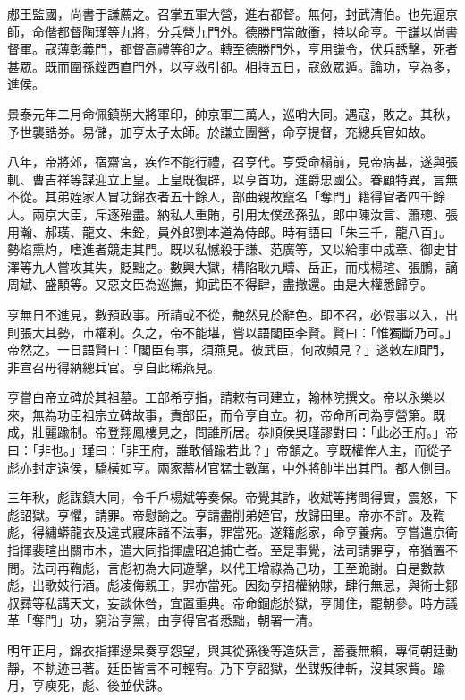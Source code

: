 \begin{pinyinscope}
郕王監國，尚書于謙薦之。召掌五軍大營，進右都督。無何，封武清伯。也先逼京師，命偕都督陶瑾等九將，分兵營九門外。德勝門當敵衝，特以命亨。于謙以尚書督軍。寇薄彰義門，都督高禮等卻之。轉至德勝門外，亨用謙令，伏兵誘擊，死者甚眾。既而圍孫鏜西直門外，以亨救引卻。相持五日，寇斂眾遁。論功，亨為多，進侯。

景泰元年二月命佩鎮朔大將軍印，帥京軍三萬人，巡哨大同。遇寇，敗之。其秋，予世襲誥券。易儲，加亨太子太師。於謙立團營，命亨提督，充總兵官如故。

八年，帝將郊，宿齋宮，疾作不能行禮，召亨代。亨受命榻前，見帝病甚，遂與張軏、曹吉祥等謀迎立上皇。上皇既復辟，以亨首功，進爵忠國公。眷顧特異，言無不從。其弟姪家人冒功錦衣者五十餘人，部曲親故竄名「奪門」籍得官者四千餘人。兩京大臣，斥逐殆盡。納私人重賄，引用太僕丞孫弘，郎中陳汝言、蕭璁、張用瀚、郝璜、龍文、朱銓，員外郎劉本道為侍郎。時有語曰「朱三千，龍八百」。勢焰熏灼，嗜進者競走其門。既以私憾殺于謙、范廣等，又以給事中成章、御史甘澤等九人嘗攻其失，貶黜之。數興大獄，構陷耿九疇、岳正，而戍楊瑄、張鵬，謫周斌、盛顒等。又惡文臣為巡撫，抑武臣不得肆，盡撤還。由是大權悉歸亨。

亨無日不進見，數預政事。所請或不從，艴然見於辭色。即不召，必假事以入，出則張大其勢，市權利。久之，帝不能堪，嘗以語閣臣李賢。賢曰：「惟獨斷乃可。」帝然之。一日語賢曰：「閣臣有事，須燕見。彼武臣，何故頻見？」遂敕左順門，非宣召毋得納總兵官。亨自此稀燕見。

亨嘗白帝立碑於其祖墓。工部希亨指，請敕有司建立，翰林院撰文。帝以永樂以來，無為功臣祖宗立碑故事，責部臣，而令亨自立。初，帝命所司為亨營第。既成，壯麗踰制。帝登翔鳳樓見之，問誰所居。恭順侯吳瑾謬對曰：「此必王府。」帝曰：「非也。」瑾曰：「非王府，誰敢僭踰若此？」帝頷之。亨既權侔人主，而從子彪亦封定遠侯，驕橫如亨。兩家蓄材官猛士數萬，中外將帥半出其門。都人側目。

三年秋，彪謀鎮大同，令千戶楊斌等奏保。帝覺其詐，收斌等拷問得實，震怒，下彪詔獄。亨懼，請罪。帝慰諭之。亨請盡削弟姪官，放歸田里。帝亦不許。及鞫彪，得繡蟒龍衣及違式寢床諸不法事，罪當死。遂籍彪家，命亨養病。亨嘗遣京衛指揮裴瑄出關市木，遣大同指揮盧昭追捕亡者。至是事覺，法司請罪亨，帝猶置不問。法司再鞫彪，言彪初為大同遊擊，以代王增祿為己功，王至跪謝。自是數款彪，出歌妓行酒。彪凌侮親王，罪亦當死。因劾亨招權納賕，肆行無忌，與術士鄒叔彞等私講天文，妄談休咎，宜置重典。帝命錮彪於獄，亨閒住，罷朝參。時方議革「奪門」功，窮治亨黨，由亨得官者悉黜，朝署一清。

明年正月，錦衣指揮逯杲奏亨怨望，與其從孫後等造妖言，蓄養無賴，專伺朝廷動靜，不軌迹已著。廷臣皆言不可輕宥。乃下亨詔獄，坐謀叛律斬，沒其家貲。踰月，亨瘐死，彪、後並伏誅。


\end{pinyinscope}
